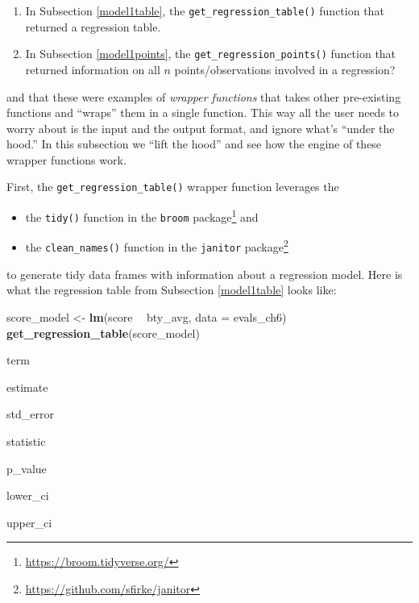 \documentclass[12pt,]{krantz}
\makeatletter
\newenvironment{Shaded}{\begin{snugshade}}{\end{snugshade}}
\newcommand{\KeywordTok}[1]{\textcolor[rgb]{0.27,0.27,0.27}{\textbf{#1}}}
\newcommand{\DataTypeTok}[1]{\textcolor[rgb]{0.27,0.27,0.27}{#1}}
\newcommand{\StringTok}[1]{\textcolor[rgb]{0.5,0.5,0.5}{#1}}
\newcommand{\OperatorTok}[1]{\textcolor[rgb]{0.43,0.43,0.43}{\textbf{#1}}}
\newcommand{\NormalTok}[1]{#1}
\providecommand{\tightlist}{%
  \setlength{\itemsep}{0pt}\setlength{\parskip}{0pt}}
\renewcommand{\href}[2]{#2\footnote{\url{#1}}}
\newenvironment{kframe}{%
\medskip{}
\setlength{\fboxsep}{.8em}
 \def\at@end@of@kframe{}%
 \ifinner\ifhmode%
  \def\at@end@of@kframe{\end{minipage}}%
  \begin{minipage}{\columnwidth}%
 \fi\fi%
 \def\FrameCommand##1{\hskip\@totalleftmargin \hskip-\fboxsep
 \colorbox{shadecolor}{##1}\hskip-\fboxsep
     \hskip-\linewidth \hskip-\@totalleftmargin \hskip\columnwidth}%
 \MakeFramed {\advance\hsize-\width
   \@totalleftmargin\z@ \linewidth\hsize
   \@setminipage}}%
 {\par\unskip\endMakeFramed%
 \at@end@of@kframe}
\renewenvironment{Shaded}{\begin{kframe}}{\end{kframe}}
\makeatother
\begin{document}
\begin{enumerate}
\def\labelenumi{\arabic{enumi}.}
\tightlist
\item
  In Subsection \ref{model1table}, the \texttt{get\_regression\_table()}
  function that returned a regression table.
\item
  In Subsection \ref{model1points}, the
  \texttt{get\_regression\_points()} function that returned information
  on all \(n\) points/observations involved in a regression?
\end{enumerate}

and that these were examples of \emph{wrapper functions} that takes
other pre-existing functions and ``wraps'' them in a single function.
This way all the user needs to worry about is the input and the output
format, and ignore what's ``under the hood.'' In this subsection we
``lift the hood'' and see how the engine of these wrapper functions
work.

First, the \texttt{get\_regression\_table()} wrapper function leverages
the

\begin{itemize}
\tightlist
\item
  the \texttt{tidy()} function in the
  \href{https://broom.tidyverse.org/}{\texttt{broom} package} and
\item
  the \texttt{clean\_names()} function in the
  \href{https://github.com/sfirke/janitor}{\texttt{janitor} package}
\end{itemize}

to generate tidy data frames with information about a regression model.
Here is what the regression table from Subsection \ref{model1table}
looks like:

\begin{Shaded}
\begin{Highlighting}[]
\NormalTok{score_model <-}\StringTok{ }\KeywordTok{lm}\NormalTok{(score }\OperatorTok{~}\StringTok{ }\NormalTok{bty_avg, }\DataTypeTok{data =}\NormalTok{ evals_ch6)}
\KeywordTok{get_regression_table}\NormalTok{(score_model)}
\end{Highlighting}
\end{Shaded}

term

estimate

std\_error

statistic

p\_value

lower\_ci

upper\_ci
\end{document}
